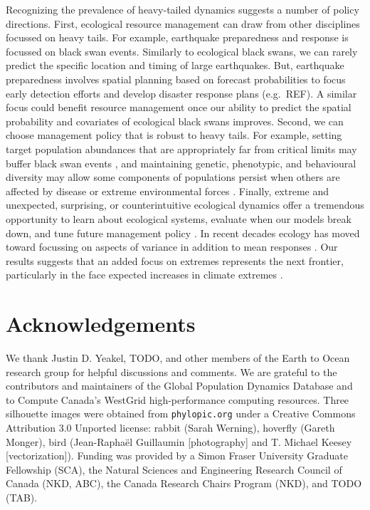 Recognizing the prevalence of heavy-tailed dynamics suggests a number of policy
directions. First, ecological resource management can draw from other
disciplines focussed on heavy tails. For example, earthquake preparedness and
response is focussed on black swan events. Similarly to ecological black swans,
we can rarely predict the specific location and timing of large earthquakes.
But, earthquake preparedness involves spatial planning based on forecast
probabilities to focus early detection efforts and develop disaster response
plans (e.g.~REF).
A similar focus could benefit resource management once our ability to
predict the spatial probability and covariates of ecological black swans
improves. Second, we can choose management policy that is robust to heavy
tails. For example, setting target population abundances that are appropriately
far from critical limits may buffer black swan events
\citep[e.g.][]{caddy1996}, and maintaining genetic, phenotypic, and behavioural
diversity may allow some components of populations persist when others are
affected by disease or extreme environmental forces
\citep[e.g.][]{schindler2010, anderson2014}. Finally, extreme and unexpected,
surprising, or counterintuitive ecological dynamics offer a tremendous
opportunity to learn about ecological systems, evaluate when our models break
down, and tune future management policy \citep{doak2008, pine-iii2009,
  lindenmayer2010}. In recent decades ecology has moved toward focussing on
aspects of variance in addition to mean responses \citep[e.g.][]{loreau2010a,
  thompson2013}. Our results suggests that an added focus on extremes
represents the next frontier, particularly in the face expected increases in
climate extremes \citep{meehl2004,ipcc2012}.

\section{Acknowledgements}

We thank Justin D. Yeakel, TODO, and other members of the Earth to Ocean
research group for helpful discussions and comments. We are grateful to the
contributors and maintainers of the Global Population Dynamics Database and to
Compute Canada's WestGrid high-performance computing resources. Three
silhouette images were obtained from \texttt{phylopic.org} under a Creative
Commons Attribution 3.0 Unported license: rabbit (Sarah Werning), hoverfly
(Gareth Monger), bird (Jean-Raphaël Guillaumin {[}photography{]} and T.
Michael Keesey {[}vectorization{]}). Funding was provided by a Simon Fraser
University Graduate Fellowship (SCA), the Natural Sciences and Engineering
Research Council of Canada (NKD, ABC), the Canada Research Chairs Program
(NKD), and TODO (TAB).

